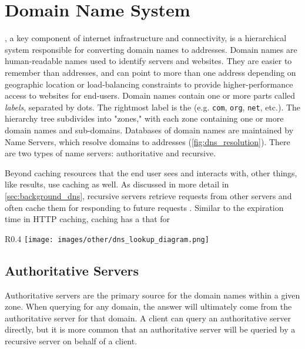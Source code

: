 \section{Domain Name System}\label{sec:background_dns}

\dns, a key component of internet infrastructure and connectivity, is a hierarchical system responsible for converting domain names to \ip addresses. Domain names are human-readable names used to identify servers and websites. They are easier to remember than \ip addresses, and can point to more than one address depending on geographic location or load-balancing constraints to provide higher-performance access to websites for end-users. Domain names contain one or more parts called \textit{labels}, separated by dots. The rightmost label is the \tld (e.g. \texttt{com}, \texttt{org}, \texttt{net}, etc.). The \dns hierarchy tree subdivides into "zones," with each zone containing one or more domain names and sub-domains. Databases of domain names are maintained by \dns Name Servers, which resolve domains to \ip addresses  (\cref{fig:dns_resolution}). There are two types of name servers: authoritative and recursive.

Beyond caching resources that the end user sees and interacts with, other things, like \dns results, use caching as well. As discussed in more detail in \autoref{sec:background_dns}, recursive \dns servers retrieve requests from other \dns servers and often cache them for responding to future requests \cite{rfc1035}. Similar to the expiration time  in HTTP caching, \dns caching has a \ttl that for

\begin{wrapfigure}[18]{R}{0.4\textwidth}
    \centering
    \texttt{[image: images/other/dns\_lookup\_diagram.png]}
    \caption{Diagram of DNS resolution \cite{Cloudflare2020a}}
    \label{fig:dns_resolution}
\end{wrapfigure}

\subsection{Authoritative Servers}
Authoritative servers are the primary source for the domain names within a given zone. When querying for any domain, the answer will ultimately come from the authoritative server for that domain. A \dns client can query an authoritative server directly, but it is more common that an authoritative server will be queried by a recursive server on behalf of a \dns client.

